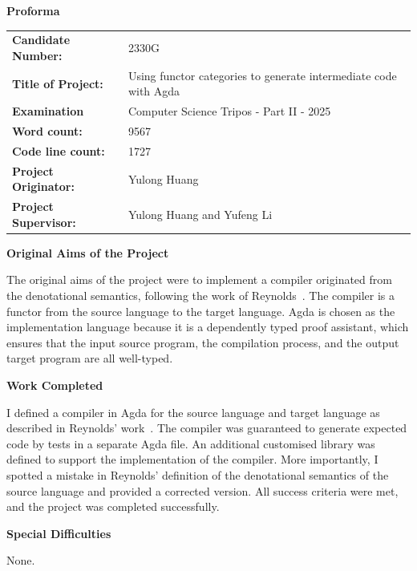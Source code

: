 \documentclass[12pt,a4paper]{report}
\theoremstyle{definition}
\begin{document}
\begin{titlepage}
    \textbf{\Huge Proforma}
    \vspace{2em}

    \begin{tabular}{ll}
        \textbf{Candidate Number:} & 2330G \\
        \textbf{Title of Project:} & Using functor categories to generate intermediate code with Agda \\
        \textbf{Examination} & Computer Science Tripos - Part II - 2025 \\
        \textbf{Word count:} & 9567 \footnotemark \\
        \textbf{Code line count:} & 1727 \footnotemark \\
        \textbf{Project Originator:} & Yulong Huang \\
        \textbf{Project Supervisor:} & Yulong Huang and Yufeng Li \\
    \end{tabular}

    \vspace{2em}
    \textbf{\Large Original Aims of the Project}
    \vspace{1em}

    The original aims of the project were to implement a compiler originated from the denotational semantics, following the work of Reynolds~\autocite{Reynolds}. The compiler is a functor from the source language to the target language. Agda is chosen as the implementation language because it is a dependently typed proof assistant, which ensures that the input source program, the compilation process, and the output target program are all well-typed.

    \vspace{2em}
    \textbf{\Large Work Completed}
    \vspace{1em}

    I defined a compiler in Agda for the source language and target language as described in Reynolds' work~\autocite{Reynolds}. The compiler was guaranteed to generate expected code by tests in a separate Agda file. An additional customised library was defined to support the implementation of the compiler. More importantly, I spotted a mistake in Reynolds' definition of the denotational semantics of the source language and provided a corrected version. All success criteria were met, and the project was completed successfully.

    \vspace{2em}
    \textbf{\Large Special Difficulties}
    \vspace{1em}
    
    None.


    \begingroup
    \endgroup
\end{titlepage}
\end{document}
